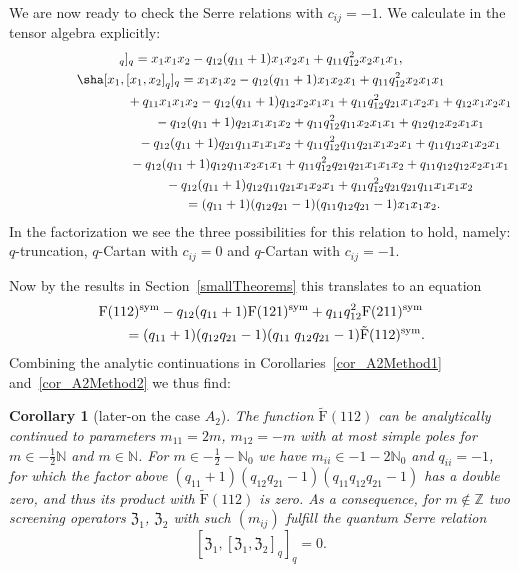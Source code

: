 \documentclass[10pt,a4paper]{amsart}
\numberwithin{equation}{section}
\newtheorem{cor}[teo]{Corollary}
\newcommand{\N}{\mathbb{N}}
\newcommand{\Z}{\mathbb{Z}}
\newcommand{\zem}{\mathfrak{Z}}
\newcommand{\Fp}{\mathrm{F}}
\newcommand{\rFp}{\tilde{\mathrm{F}}}
\begin{document}
We are now ready to check the Serre relations with $c_{ij}=-1$. We calculate in the tensor algebra explicitly:
\begin{gather*}
[x_1,[x_1,x_2]_q]_q=x_1x_1x_2-q_{12}(q_{11}+1)x_1x_2x_1+q_{11}q_{12}^2 x_2x_1x_1, \\
 \sha [x_1,[x_1,x_2]_q]_q =x_1x_1x_2 -q_{12}(q_{11}+1)  x_1x_2x_1+q_{11}q_{12}^2  x_2x_1x_1 \\
\hphantom{\sha [x_1,[x_1,x_2]_q]_q =}{}
+q_{11}x_1x_1x_2 -q_{12}(q_{11}+1) q_{12} x_2x_1x_1+ q_{11}q_{12}^2  q_{21}x_1x_2x_1+q_{12}x_1x_2x_1 \\
\hphantom{\sha [x_1,[x_1,x_2]_q]_q =}{}
-q_{12}(q_{11}+1)  q_{21}x_1x_1x_2 +q_{11}q_{12}^2  q_{11}x_2x_1x_1+q_{12}q_{12}x_2x_1x_1 \\
\hphantom{\sha [x_1,[x_1,x_2]_q]_q =}{}
-q_{12}(q_{11}+1) q_{21}q_{11}x_1x_1x_2+q_{11}q_{12}^2  q_{11}q_{21}x_1x_2x_1+q_{11}q_{12}x_1x_2x_1 \\
\hphantom{\sha [x_1,[x_1,x_2]_q]_q =}{}
-q_{12}(q_{11}+1) q_{12}q_{11} x_2x_1x_1+ q_{11}q_{12}^2  q_{21}q_{21} x_1x_1x_2+q_{11}q_{12}q_{12}x_2x_1x_1 \\
\hphantom{\sha [x_1,[x_1,x_2]_q]_q =}{}
-q_{12}(q_{11}+1) q_{12}q_{11}q_{21} x_1x_2x_1+ q_{11}q_{12}^2  q_{21}q_{21}q_{11} x_1x_1x_2 \\
\hphantom{\sha [x_1,[x_1,x_2]_q]_q }{}
=(q_{11}+1)(q_{12}q_{21}-1)(q_{11} q_{12}q_{21}-1)x_1x_1x_2.
\end{gather*}
In the factorization we see the three possibilities for this relation to hold, namely: $q$-truncation, $q$-Cartan with $c_{ij}=0$ and $q$-Cartan with $c_{ij}=-1$.

Now by the results in Section~\ref{smallTheorems} this translates to an equation
\begin{gather*}
 \Fp(112)^{{\rm sym}}-q_{12}(q_{11}+1)\Fp(121)^{{\rm sym}}+q_{11}q_{12}^2 \Fp(211)^{{\rm sym}}\\
\qquad{} =(q_{11}+1)(q_{12}q_{21}-1)(q_{11}\;q_{12}q_{21}-1)\rFp(112)^{{\rm sym}}.
\end{gather*}
Combining the analytic continuations in Corollaries~\ref{cor_A2Method1} and~\ref{cor_A2Method2} we thus find:

\begin{cor}[later-on the case $A_2$]\label{cor_A2}
The function $\rFp(112)$ can be analytically continued to parameters $m_{11}=2m$, $m_{12}=-m$ with at most simple poles for $m\in-\frac{1}{2}\N$ and $m\in\N$. For $m\in-\frac{1}{2}-\N_0$ we have $m_{ii}\in -1-2\N_0$ and $q_{ii}=-1$, for which the factor above $(q_{11}+1)(q_{12}q_{21}\allowbreak -1)(q_{11} q_{12}q_{21}-1)$ has a double zero, and thus its product with $\rFp(112)$ is zero. As a consequence, for $m\not\in \Z$ two screening operators $\zem_1$, $\zem_2$ with such $(m_{ij})$ fulfill the quantum Serre relation
\[[\zem_1,[\zem_1,\zem_2]_q]_q=0.\]
\end{cor}
\end{document}
